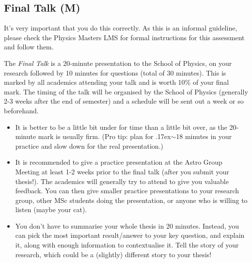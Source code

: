 \documentclass[11pt, oneside, a4paper]{article}
\newcommand{\tipscolor}{ForestGreen}
\newcommand{\mytilde}{\raise.17ex\hbox{$\scriptstyle\mathtt{\sim}$}}
\begin{document}
\subsection*{Final Talk (M)}\label{FinalTalk}

\begin{tcolorbox}[colback=red!5!white,colframe=red!50!white,title={IMPORTANT}]
    It's very important that you do this correctly. As this is an informal guideline, please check the Physics Masters LMS for formal instructions for this assessment and follow them. 
\end{tcolorbox} 

The \textit{Final Talk} is a 20-minute presentation to the School of Physics, on your research followed by 10 minutes for questions (total of 30 minutes).
This is marked by all academics attending your talk and is worth 10\% of your final mark.
The timing of the talk will be organised by the School of Physics (generally 2-3 weeks after the end of semester) and a schedule will be sent out a week or so beforehand.

\begin{tcolorbox}[colback=\tipscolor!5!white,colframe=\tipscolor!50!white,title={Tips \& Tricks}]
    \begin{itemize}
        \item It is better to be a little bit under for time than a little bit over, as the 20-minute mark is usually firm. (Pro tip: plan for \mytilde18 minutes in your practice and slow down for the real presentation.)
        \item It is recommended to give a practice presentation at the Astro Group Meeting at least 1-2 weeks prior to the final talk (after you submit your thesis!). 
        The academics will generally try to attend to give you valuable feedback. 
        You can then give smaller practice presentations to your research group, other MSc students doing the presentation, or anyone who is willing to listen (maybe your cat).    
    \end{itemize}
\end{tcolorbox} 

\begin{tcolorbox}[colback=\tipscolor!5!white,colframe=\tipscolor!50!white,title={Tips \& Tricks (cont.)}]
    \begin{itemize}
        \item You don't have to summarise your whole thesis in 20 minutes. 
        Instead, you can pick the most important result/answer to your key question, and explain it, along with enough information to contextualise it. 
        Tell the story of your research, which could be a (slightly) different story to your thesis!     
    \end{itemize}
\end{tcolorbox} 
\end{document}
